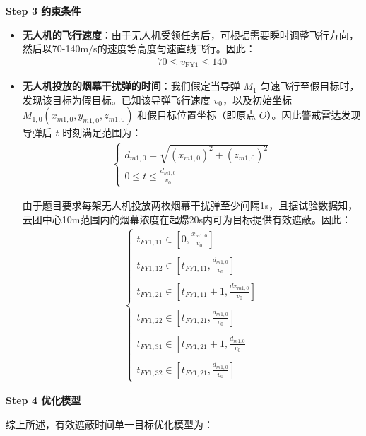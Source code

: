 \documentclass[../main.tex]{subfiles}
\begin{document}
\textbf{Step 3 约束条件}
\begin{itemize}
\item \textbf{无人机的飞行速度}：由于无人机受领任务后，可根据需要瞬时调整飞行方向，然后以70-140m/s的速度等高度匀速直线飞行。因此：
\begin{align}\label{15.8}
  70 \leq v_{\text{FY1}} \leq 140
\end{align}
\item \textbf{无人机投放的烟幕干扰弹的时间}：我们假定当导弹 \( M_1 \) 匀速飞行至假目标时，发现该目标为假目标。已知该导弹飞行速度 \( v_0 \)，以及初始坐标 \( M_{1,0}(x_{m1,0}, y_{m1,0}, z_{m1,0}) \) 和假目标位置坐标（即原点 \( O \)）。因此警戒雷达发现导弹后 \( t \) 时刻满足范围为：
\begin{align}
\begin{cases}
d_{m1,0} = \sqrt{(x_{m1,0})^2 + (z_{m1,0})^2} \\
0 \leq t \leq \frac{d_{m1,0}}{v_0}
\end{cases}
\end{align}
\par 由于题目要求每架无人机投放两枚烟幕干扰弹至少间隔1s，且据试验数据知，云团中心10m范围内的烟幕浓度在起爆20s内可为目标提供有效遮蔽。因此：
\begin{align}
\left\{ \begin{array}{l}
	t_{FY1,11}\in \left[ 0, \frac{x_{m1,0}}{v_0} \right]
	\\\\
	t_{FY1,12}\in \left[ t_{FY1,11}, \frac{d_{m1,0}}{v_0} \right]
	\\\\
	t_{FY1,21}\in \left[ t_{FY1,11}+1, \frac{dx_{m1,0}}{v_0} \right]
	\\\\
	t_{FY1,22}\in \left[ t_{FY1,21}, \frac{d_{m1,0}}{v_0} \right]
	\\\\
	t_{FY1,31}\in \left[ t_{FY1,21}+1, \frac{d_{m1,0}}{v_0} \right]
	\\\\
	t_{FY1,32}\in \left[ t_{FY1,21}, \frac{d_{m1,0}}{v_0} \right]
\end{array} \right. 
\end{align}
\end{itemize}
\textbf{Step 4 优化模型}
\par 综上所述，有效遮蔽时间单一目标优化模型为：
\end{document}
